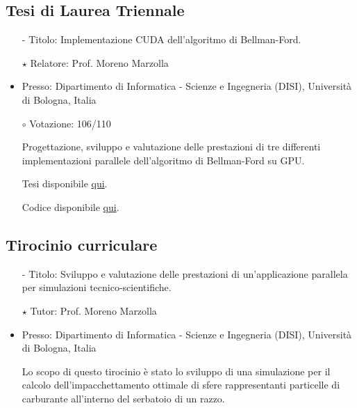 \documentclass[curriculum-vitae-ita]{subfiles}
\begin{document}
		\subsection*{Tesi di Laurea Triennale}
			\begin{itemize}
				\item[-] {\large Titolo:} Implementazione CUDA dell'algoritmo di Bellman-Ford.
				\item[$\star$] {\large Relatore:} Prof. Moreno Marzolla
				\item {\large Presso:} Dipartimento di Informatica - Scienze e Ingegneria (DISI), Università di Bologna, Italia
				\item[$\circ$] {\large Votazione:} 106/110
				\item[] Progettazione, sviluppo e valutazione delle prestazioni di tre differenti implementazioni parallele dell'algoritmo di Bellman-Ford su GPU.
				\item[] Tesi disponibile \href{https://amslaurea.unibo.it/24313}{qui}.
				\item[] Codice disponibile \href{https://github.com/Ledmington/bellman-ford-cuda}{qui}.
			\end{itemize}
		
		\subsection*{Tirocinio curriculare}
			\begin{itemize}
				\item[-] {\large Titolo:} Sviluppo e valutazione delle prestazioni di un'applicazione parallela per simulazioni tecnico-scientifiche.
				\item[$\star$] {\large Tutor:} Prof. Moreno Marzolla
				\item {\large Presso:} Dipartimento di Informatica - Scienze e Ingegneria (DISI), Università di Bologna, Italia
				\item[] Lo scopo di questo tirocinio è stato lo sviluppo di una simulazione per il calcolo dell'impacchettamento ottimale di sfere rappresentanti particelle di carburante all'interno del serbatoio di un razzo.
			\end{itemize}
		
		\iffalse
		\subsection*{Esami sostenuti durante il corso di laurea magistrale}
			{\small Ultimo aggiornamento: 27/01/2022}
			\medskip
			
			\begin{minipage}[t]{.47\textwidth}
				\exam{Machine Learning}{29}
			\end{minipage}
			\hfill
			\begin{minipage}[t]{.47\textwidth}
				\exam{Linguaggi, Compilatori e Modelli Computazionali}{29}
			\end{minipage}
		\fi
\end{document}
